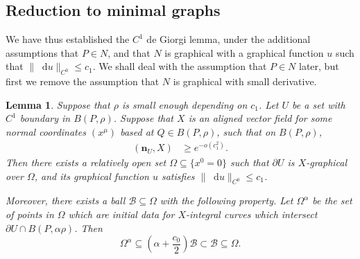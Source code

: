 \documentclass[reqno,11pt]{amsart}
\newcommand*\dif{\mathop{}\!\mathrm{d}}
\newcommand{\normal}{\mathbf n}
\newtheorem{lemma}[theorem]{Lemma}
\theoremstyle{definition}
\numberwithin{equation}{section}
\begin{document}
\subsection{Reduction to minimal graphs}
We have thus established the $C^1$ de Giorgi lemma, under the additional assumptions that $P \in N$, and that $N$ is graphical with a graphical function $u$ such that $\|\dif u\|_{C^0} \leq c_1$.
We shall deal with the assumption that $P \in N$ later, but first we remove the assumption that $N$ is graphical with small derivative.

\begin{lemma}\label{hypersurfaces are graphical}
Suppose that $\rho$ is small enough depending on $c_1$.
Let $U$ be a set with $C^1$ boundary in $B(P, \rho)$.
Suppose that $X$ is an aligned vector field for some normal coordinates $(x^\mu)$ based at $Q \in B(P, \rho)$, such that on $B(P, \rho)$,
\begin{align}
(\normal_U, X) &\geq e^{-o(c_1^2)}. \label{rep as a good graph hyp}
\end{align}
Then there exists a relatively open set $\Omega \subseteq \{x^0 = 0\}$ such that $\partial U$ is $X$-graphical over $\Omega$, and its graphical function $u$ satisfies $\|\dif u\|_{C^0} \leq c_1$.

Moreover, there exists a ball $\mathscr B \subseteq \Omega$ with the following property.
Let $\Omega^\alpha$ be the set of points in $\Omega$ which are initial data for $X$-integral curves which intersect $\partial U \cap B(P, \alpha \rho)$.
Then 
\begin{equation}\label{rep as a good graph set nests}
    \Omega^\alpha \subseteq \left(\alpha + \frac{c_0}{2}\right) \mathscr B \subset \mathscr B \subseteq \Omega.
\end{equation}
\end{lemma}
\end{document}
